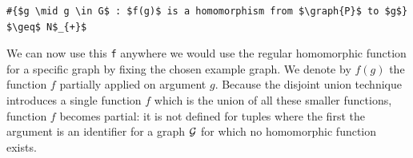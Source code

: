 \begin{center}
\begin{minipage}{0.62\linewidth}
\begin{lstlisting}[mathescape, caption=Globalized existential functions, label=lst:GlobalizeExistentialQuantifications]
#{$g \mid g \in G$ : $f(g)$ is a homomorphism from $\graph{P}$ to $g$} $\geq$ N$_{+}$
\end{lstlisting}
\end{minipage}
\end{center}

We can now use this \verb|f| anywhere we would use the regular homomorphic function for a specific graph by fixing the chosen example graph.
We denote by $f(g)$ the function $f$ partially applied on argument $g$.
Because the disjoint union technique introduces a single function $f$ which is the union of all these smaller functions, function $f$ becomes partial: it is not defined for tuples where the first the argument is an identifier for a graph $\mathcal{G}$ for which no homomorphic function exists.




